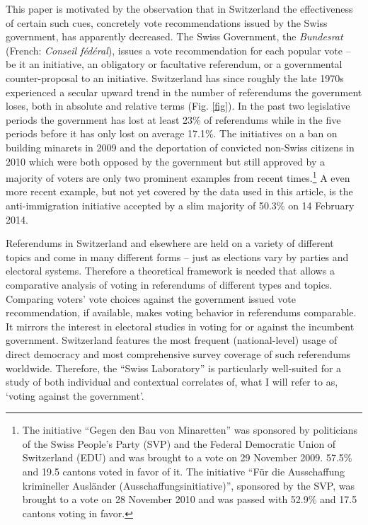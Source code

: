 \documentclass[11pt,a4paper]{article}\usepackage[]{graphicx}\usepackage[]{color}
\begin{document}
    This paper is motivated by the observation that in Switzerland the effectiveness of certain such cues, concretely vote recommendations issued by the Swiss government, has apparently decreased. The Swiss Government, the \textit{Bundesrat} (French: \textit{Conseil fédéral}), issues a vote recommendation for each popular vote -- be it an initiative, an obligatory or facultative referendum, or a governmental counter-proposal to an initiative. Switzerland has since roughly the late 1970s experienced a secular upward trend in the number of referendums the government loses, both in absolute and relative terms (Fig. \ref{fig}). In the past two legislative periods the government has lost at least 23\% of referendums while in the five periods before it has only lost on average 17.1\%. 
    The initiatives on a ban on building minarets in 2009 and the deportation of convicted non-Swiss citizens in 2010 which were both opposed by the government but still approved by a majority of voters are only two prominent examples from recent times.\footnote{The initiative ``Gegen den Bau von Minaretten'' was sponsored by politicians of the Swiss People's Party (SVP) and the Federal Democratic Union of Switzerland (EDU) and was brought to a vote on 29 November 2009. 57.5\% and
    19.5 cantons voted in favor of it. 
    The initiative ``Für die Ausschaffung krimineller Ausländer (Ausschaffungsinitiative)'', sponsored by the SVP, was brought to a vote on 28 November 2010 and was passed with 52.9\% and  
    17.5 cantons voting in favor. } A even more recent example, but not yet covered by the data used in this article, is the anti-immigration initiative accepted by a slim majority of 50.3\% on 14 February 2014.
    
    Referendums in Switzerland and elsewhere are held on a variety of different topics and come in many different forms -- just as elections vary by parties and electoral systems. Therefore a theoretical framework is needed that allows a comparative analysis of voting in referendums of different types and topics. Comparing voters' vote choices against the government issued vote recommendation, if available, makes voting behavior in referendums comparable. It mirrors the interest in electoral studies in voting for or against the incumbent government.  Switzerland features the most frequent (national-level) usage of direct democracy and most comprehensive survey coverage of such referendums worldwide. Therefore, the ``Swiss Laboratory'' \citep{kriesi_direct_2005} is particularly well-suited for a study of both individual and contextual correlates of, what I will refer to as, `voting against the government'.
    
\end{document}
